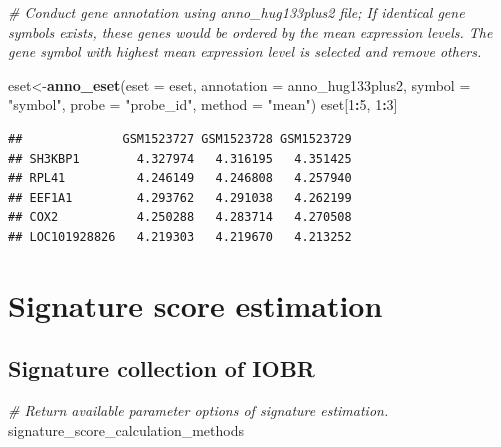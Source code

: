 \documentclass[
  12pt,
]{book}
\newenvironment{Shaded}{\begin{snugshade}}{\end{snugshade}}
\newcommand{\AttributeTok}[1]{\textcolor[rgb]{0.13,0.29,0.53}{#1}}
\newcommand{\CommentTok}[1]{\textcolor[rgb]{0.56,0.35,0.01}{\textit{#1}}}
\newcommand{\DecValTok}[1]{\textcolor[rgb]{0.00,0.00,0.81}{#1}}
\newcommand{\FunctionTok}[1]{\textcolor[rgb]{0.13,0.29,0.53}{\textbf{#1}}}
\newcommand{\NormalTok}[1]{#1}
\newcommand{\OtherTok}[1]{\textcolor[rgb]{0.56,0.35,0.01}{#1}}
\newcommand{\SpecialCharTok}[1]{\textcolor[rgb]{0.81,0.36,0.00}{\textbf{#1}}}
\newcommand{\StringTok}[1]{\textcolor[rgb]{0.31,0.60,0.02}{#1}}
\begin{document}
\begin{Shaded}
\begin{Highlighting}[]
\CommentTok{\# Conduct gene annotation using \textasciigrave{}anno\_hug133plus2\textasciigrave{} file; If identical gene symbols exists, these genes would be ordered by the mean expression levels. The gene symbol with highest mean expression level is selected and remove others. }

\NormalTok{eset}\OtherTok{\textless{}{-}}\FunctionTok{anno\_eset}\NormalTok{(}\AttributeTok{eset       =}\NormalTok{ eset,}
                \AttributeTok{annotation =}\NormalTok{ anno\_hug133plus2,}
                \AttributeTok{symbol     =} \StringTok{"symbol"}\NormalTok{,}
                \AttributeTok{probe      =} \StringTok{"probe\_id"}\NormalTok{,}
                \AttributeTok{method     =} \StringTok{"mean"}\NormalTok{)}
\NormalTok{eset[}\DecValTok{1}\SpecialCharTok{:}\DecValTok{5}\NormalTok{, }\DecValTok{1}\SpecialCharTok{:}\DecValTok{3}\NormalTok{]}
\end{Highlighting}
\end{Shaded}

\begin{verbatim}
##              GSM1523727 GSM1523728 GSM1523729
## SH3KBP1        4.327974   4.316195   4.351425
## RPL41          4.246149   4.246808   4.257940
## EEF1A1         4.293762   4.291038   4.262199
## COX2           4.250288   4.283714   4.270508
## LOC101928826   4.219303   4.219670   4.213252
\end{verbatim}

\hypertarget{signature-score-estimation}{%
\section{Signature score estimation}\label{signature-score-estimation}}

\hypertarget{signature-collection-of-iobr}{%
\subsection{Signature collection of IOBR}\label{signature-collection-of-iobr}}

\begin{Shaded}
\begin{Highlighting}[]
\CommentTok{\# Return available parameter options of signature estimation.}
\NormalTok{signature\_score\_calculation\_methods}
\end{Highlighting}
\end{Shaded}
\end{document}
